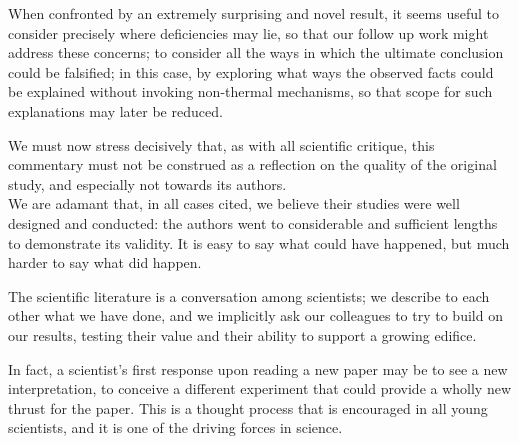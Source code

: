 \documentclass[paper.tex]{subfiles}
\begin{document}
When confronted by an extremely surprising and novel result, it seems useful to consider precisely where deficiencies may lie, so that our follow up work might address these concerns; to consider all the ways in which the ultimate conclusion could be falsified; in this case, by exploring what ways the observed facts could be explained without invoking non-thermal mechanisms, so that scope for such explanations may later be reduced.



\begin{toolchain}
We must now stress decisively that, as with all scientific critique, this commentary must not be construed as a reflection on the quality of the original study, and especially not towards its authors.\\ 

We are adamant that, in all cases cited, we believe their studies were well designed and conducted: the authors went to considerable and sufficient lengths to demonstrate its validity. It is easy to say what could have happened, but much harder to say what did happen.
\end{toolchain}


\begin{fquote}
	The scientific literature is a conversation among scientists; we describe to each other what we have done, and we implicitly ask our colleagues to try to build on our results, testing their value and their ability to support a growing edifice.
	
	In fact, a scientist's first response upon reading a new paper may be to see a new interpretation, to conceive a different experiment that could provide a wholly new thrust for the paper. This is a thought process that is encouraged in all young scientists, and it is one of the driving forces in science.
\end{fquote}
\end{document}
